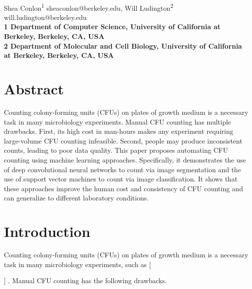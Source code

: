 \documentclass[10pt,letterpaper]{article}
\date{}
\newcommand{\fillin}[1]{
    \IfEqCase{#1}{%
        {short}{\_}%
        {long}{\_\_\_\_\_}%
    }[\PackageError{fillin}{Undefined option to fillin: #1}{}]
}
\begin{document}
\vspace*{0.35in}

\begin{flushleft}
{\Large
\textbf{}
}
\newline
\\
Shea Conlon\textsuperscript{1} sheaconlon@berkeley.edu,
Will Ludington\textsuperscript{2} will.ludington@berkeley.edu
\\
\bigskip
\bf{1} Department of Computer Science, University of California at Berkeley, Berkeley, CA, USA
\\
\bf{2} Department of Molecular and Cell Biology, University of California at Berkeley, Berkeley, CA, USA
\\
\bigskip
\end{flushleft}
\section*{Abstract}
    Counting colony-forming units (CFUs) on plates of growth medium is a necessary task in many microbiology experiments. Manual CFU counting has multiple drawbacks. First, its high cost in man-hours makes any experiment requiring large-volume CFU counting infeasible. Second, people may produce inconsistent counts, leading to poor data quality. This paper proposes automating CFU counting using machine learning approaches. Specifically, it demonstrates the use of deep convolutional neural networks to count via image segmentation and the use of support vector machines to count via image classification. It shows that these approaches improve the human cost and consistency of CFU counting and can generalize to different laboratory conditions.

\linenumbers

\section*{Introduction}
    Counting colony-forming units (CFUs) on plates of growth medium is a necessary task in many microbiology experiments, such as \fillin{long}. Manual CFU counting has the following drawbacks.
\end{document}
